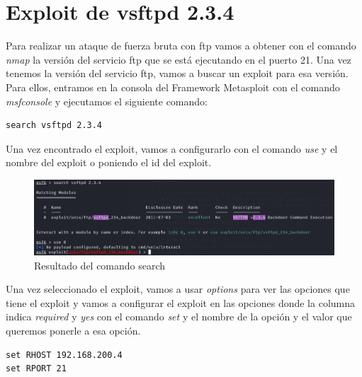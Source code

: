 \documentclass[11pt]{report}
\begin{document}



\section{Exploit de vsftpd 2.3.4}
Para realizar un ataque de fuerza bruta con ftp vamos a obtener con el comando \emph{nmap} la versión del servicio ftp que se está ejecutando en el puerto 21.
Una vez tenemos la versión del servicio ftp, vamos a buscar un exploit para esa versión. Para ellos, entramos en la consola del Framework Metasploit con el comando \emph{msfconsole} y ejecutamos el siguiente comando:
\begin{BVerbatim}
search vsftpd 2.3.4
\end{BVerbatim}

Una vez encontrado el exploit, vamos a configurarlo con el comando \emph{use} y el nombre del exploit o poniendo el id del exploit.
\begin{figure}[H]
  \centering
  \includegraphics[scale=0.5]{img/search_vsftpd.png}
  \caption{Resultado del comando search}
\end{figure}

Una vez seleccionado el exploit, vamos a usar \emph{options} para ver las opciones que tiene el exploit y vamos a configurar el exploit en las opciones donde la columna indica \emph{required} y \emph{yes} con el comando 
\emph{set} y el nombre de la opción y el valor que queremos ponerle a esa opción.
\begin{verbatim}
set RHOST 192.168.200.4
set RPORT 21
\end{verbatim}
\end{document}
